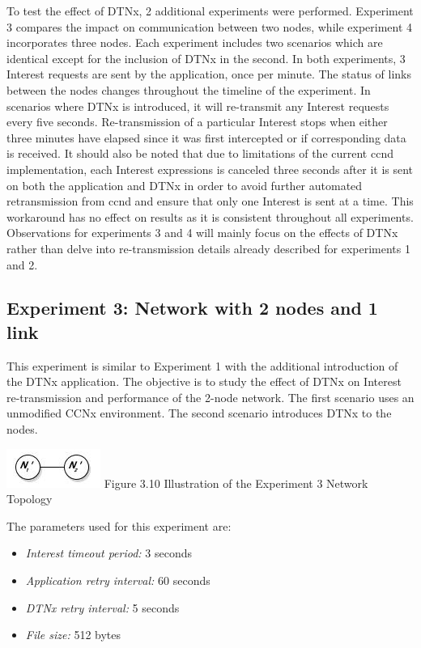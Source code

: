 \documentclass[a4paper,12pt]{report}      %
\begin{document}
To test the effect of DTNx, 2 additional experiments were performed. Experiment 3 compares the
impact on communication between two nodes, while experiment 4 incorporates three nodes. Each
experiment includes two scenarios which are identical except for the inclusion of DTNx in the second.
In both experiments, 3 Interest requests are sent by the application, once per minute. The status of links
between the nodes changes throughout the timeline of the experiment. In scenarios where DTNx is
introduced, it will re-transmit any Interest requests every five seconds. Re-transmission of a particular
Interest stops when either three minutes have elapsed since it was first intercepted or if corresponding
data is received. It should also be noted that due to limitations of the current ccnd implementation, each
Interest expressions is canceled three seconds after it is sent on both the application and DTNx in order
to avoid further automated retransmission from ccnd and ensure that only one Interest is sent at a time.
This workaround has no effect on results as it is consistent throughout all experiments.
Observations for experiments 3 and 4 will mainly focus on the effects of DTNx rather than delve into
re-transmission details already described for experiments 1 and 2.

\subsection{Experiment 3: Network with 2 nodes and 1 link}

This experiment is similar to Experiment 1 with the additional introduction of the DTNx application. The objective is to study the effect of DTNx on Interest re-transmission and performance of the 2-node network. The first scenario uses an unmodified CCNx environment. The second scenario introduces DTNx to the nodes.


\begin{center}
\includegraphics[scale=0.75]{exp3topo.jpg}\newline
Figure 3.10 Illustration of the Experiment 3 Network Topology 
\end{center}


\noindent The parameters used for this experiment are:
\begin{itemize}
\item \textsl{Interest timeout period:} 3 seconds
\item \textsl{Application retry interval:} 60 seconds
\item \textsl{DTNx retry interval:} 5 seconds
\item \textsl{File size:} 512 bytes
\end{itemize}
\end{document}
